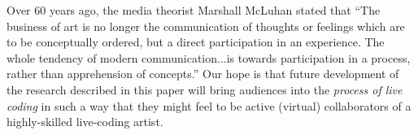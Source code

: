 \documentclass{sig-alternate}
\begin{document}
Over 60 years ago, the media theorist Marshall McLuhan stated that ``The business of art is no longer the communication of thoughts or feelings which are to be conceptually ordered, but a direct participation in an experience. The whole tendency of modern communication...is towards participation in a process, rather than apprehension of concepts.'' \cite{McLuhan} Our hope is that future development of the research described in this paper will bring audiences into the {\em process of live coding} in such a way that they might feel to be active (virtual) collaborators of a highly-skilled live-coding artist.




%

\end{document}
